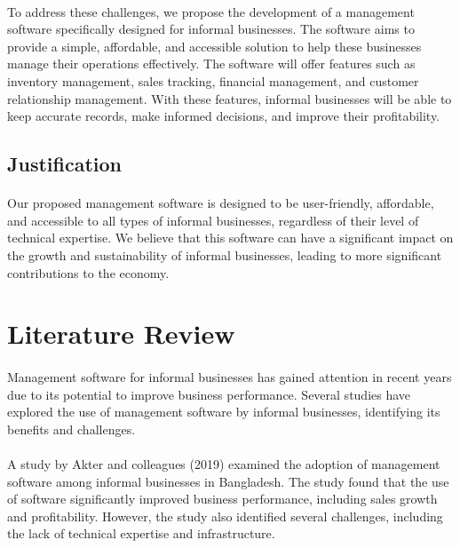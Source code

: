 \documentclass{article}
\begin{document}
\paragraph*{}
To address these challenges, we propose the development of a management software specifically designed for informal businesses. The software aims to provide a simple, affordable, and accessible solution to help these businesses manage their operations effectively. The software will offer features such as inventory management, sales tracking, financial management, and customer relationship management. With these features, informal businesses will be able to keep accurate records, make informed decisions, and improve their profitability.

\subsection{Justification}
\paragraph*{}
Our proposed management software is designed to be user-friendly, affordable, and accessible to all types of informal businesses, regardless of their level of technical expertise. We believe that this software can have a significant impact on the growth and sustainability of informal businesses, leading to more significant contributions to the economy.

\newpage


\section{Literature Review}
\paragraph*{}
Management software for informal businesses has gained attention in recent years due to its potential to improve business performance. Several studies have explored the use of management software by informal businesses, identifying its benefits and challenges.

\paragraph*{}
A study by Akter and colleagues (2019) examined the adoption of management software among informal businesses in Bangladesh. The study found that the use of software significantly improved business performance, including sales growth and profitability. However, the study also identified several challenges, including the lack of technical expertise and infrastructure.
\end{document}
